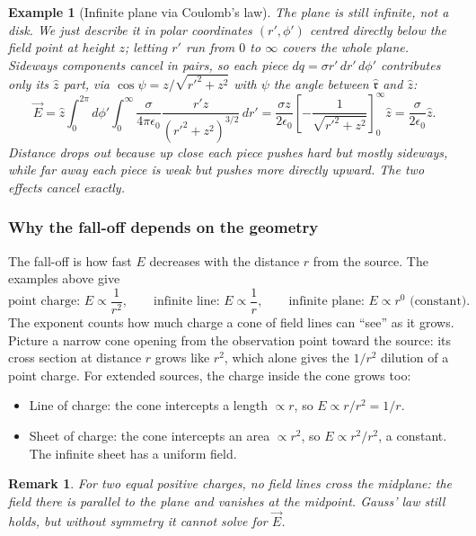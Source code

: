 \documentclass{article}
\newtheorem*{example}{Example}
\newtheorem{remark}{Remark}
\begin{document}
\begin{example}[Infinite plane via Coulomb's law]
    The plane is still infinite, not a disk. We just describe it in polar coordinates $(r',\phi')$ centred directly below the field point at height $z$; letting $r'$ run from $0$ to $\infty$ covers the whole plane. Sideways components cancel in pairs, so each piece $dq = \sigma r'\,dr'\,d\phi'$ contributes only its $\hat{z}$ part, via $\cos\psi = z/\sqrt{r'^2+z^2}$ with $\psi$ the angle between $\hat{\mathfrak{r}}$ and $\hat{z}$:
    \[\vec{E} = \hat{z}\int_0^{2\pi}\!d\phi'\int_0^\infty \frac{\sigma}{4\pi\epsilon_0}\frac{r'z}{(r'^2+z^2)^{3/2}}\,dr' = \frac{\sigma z}{2\epsilon_0}\left[-\frac{1}{\sqrt{r'^2+z^2}}\right]_0^\infty\hat{z} = \frac{\sigma}{2\epsilon_0}\hat{z}.\]
    Distance drops out because up close each piece pushes hard but mostly sideways, while far away each piece is weak but pushes more directly upward. The two effects cancel exactly.
\end{example}

\subsubsection{Why the fall-off depends on the geometry}
The fall-off is how fast $E$ decreases with the distance $r$ from the source. The examples above give
\[\text{point charge: } E \propto \frac{1}{r^2}, \qquad \text{infinite line: } E \propto \frac{1}{r}, \qquad \text{infinite plane: } E \propto r^0 \text{ (constant)}.\]
The exponent counts how much charge a cone of field lines can ``see'' as it grows. Picture a narrow cone opening from the observation point toward the source: its cross section at distance $r$ grows like $r^2$, which alone gives the $1/r^2$ dilution of a point charge. For extended sources, the charge inside the cone grows too:
\begin{itemize}
    \item Line of charge: the cone intercepts a length $\propto r$, so $E \propto r/r^2 = 1/r$.
    \item Sheet of charge: the cone intercepts an area $\propto r^2$, so $E \propto r^2/r^2$, a constant. The infinite sheet has a uniform field.
\end{itemize}
\begin{remark}
    For two equal positive charges, no field lines cross the midplane: the field there is parallel to the plane and vanishes at the midpoint. Gauss' law still holds, but without symmetry it cannot solve for $\vec{E}$.
\end{remark}
\end{document}
